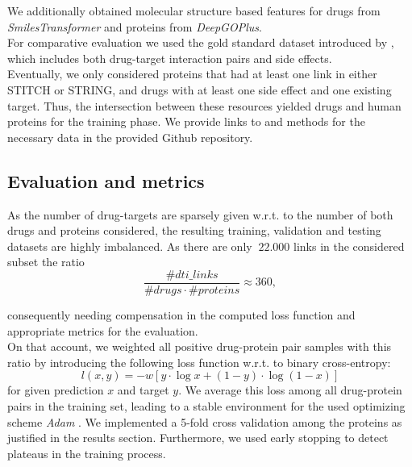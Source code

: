 \documentclass{bioinfo}
\begin{document}
We additionally obtained molecular structure based features for drugs from \textit{SmilesTransformer}\citep{SmilesTransformer} and proteins from \textit{DeepGOPlus}\citep{DeepGoPlus}.\\

For comparative evaluation we used the gold standard dataset introduced by \citet{Yaminishi2008}, which includes both drug-target interaction pairs and side effects.\\ 
 
Eventually, we only considered proteins that had at least one link in either STITCH or STRING, and drugs with at least one side effect and one existing target. Thus, the intersection between these resources yielded  drugs and  human proteins for the training phase. We provide links to and methods for the necessary data in the provided Github repository.\\

\subsection{Evaluation and metrics}
As the number of drug-targets are sparsely given w.r.t. to the number of both drugs and proteins considered, the resulting training, validation and testing datasets are highly imbalanced. As there are only $~22.000$ links in the considered subset the ratio
\begin{equation*}
	\frac{\#dti\_links}{\#drugs \cdot \#proteins} \approx 360,
\end{equation*}

consequently needing compensation in the computed loss function and appropriate metrics for the evaluation.\\

On that account, we weighted all positive drug-protein pair samples with this ratio by introducing the following loss function w.r.t. to binary cross-entropy:
\begin{equation}
	l(x,y) = - w \left[ y \cdot \log x + (1 - y) \cdot \log (1 - x) \right]
\end{equation}
for given prediction $x$ and target $y$. We average this loss among all drug-protein pairs in the training set, leading to a stable environment for the used optimizing scheme \textit{Adam} \citep{Adam2014}. We implemented a 5-fold cross validation among the proteins as justified in the results section. Furthermore, we  used early stopping to detect plateaus in the training process. \\
\end{document}
